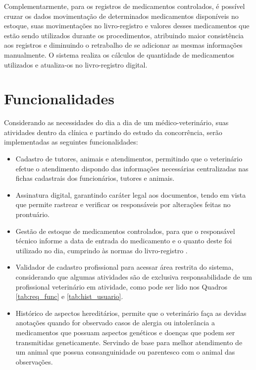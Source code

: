 \documentclass[
    12pt,               %
    openright,          %
    oneside,
    a4paper,            %
    BIBLATEX,           %
    TODO,               %
    english,            %
    brazil              %
    ]{ifsp-spo-inf-ctds}
\begin{document}
        Complementarmente, para os registros de medicamentos controlados, é possível cruzar os dados movimentação de determinados medicamentos disponíveis no estoque, suas movimentações no livro-registro e valores desses medicamentos que estão sendo utilizados durante os procedimentos, atribuindo maior consistência aos registros e diminuindo o retrabalho de se adicionar as mesmas informações manualmente. O sistema realiza os cálculos de quantidade de medicamentos utilizados e atualiza-os no livro-registro digital.

    \section{Funcionalidades}

        Considerando as necessidades do dia a dia de um médico-veterinário, suas atividades dentro da clínica e partindo do estudo da concorrência, serão implementadas as seguintes funcionalidades:

        \begin{itemize}
            \item Cadastro de tutores, animais e atendimentos, permitindo que o veterinário efetue o atendimento dispondo das informações necessárias centralizadas nas fichas cadastrais dos funcionários, tutores e animais.
            \item Assinatura digital, garantindo caráter legal aos documentos, tendo em vista que permite rastrear e verificar os responsáveis por alterações feitas no prontuário. 
            \item Gestão de estoque de medicamentos controlados, para que o responsável técnico informe a data de entrada do medicamento e o quanto deste foi utilizado no dia, cumprindo às normas do livro-registro .
            \item Validador de cadastro profissional para acessar área restrita do sistema, considerando que algumas atividades são de exclusiva responsabilidade de um profissional veterinário em atividade, como pode ser lido nos Quadros \ref{tab:req_func} e \ref{tab:hist_usuario}.
            \item Histórico de aspectos hereditários, permite que o veterinário faça as devidas anotações quando for observado casos de alergia ou intolerância a medicamentos que possuam aspectos genéticos e doenças que podem ser transmitidas geneticamente. Servindo de base para melhor atendimento de um animal que possua consanguinidade ou parentesco com o animal das observações.
        \end{itemize}
\end{document}
